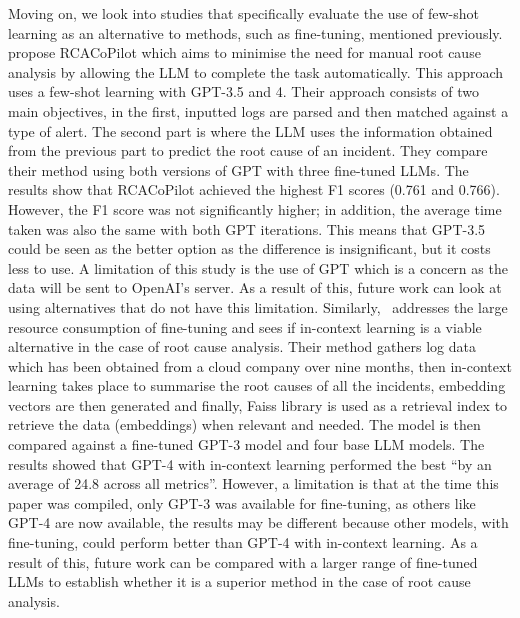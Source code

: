 Moving on, we look into studies that specifically evaluate the use of few-shot learning as an alternative to methods, such as fine-tuning, mentioned previously.~\cite{chen2024automatic} propose RCACoPilot which aims to minimise the need for manual root cause analysis by allowing the LLM to complete the task automatically. This approach uses a few-shot learning with GPT-3.5 and 4. Their approach consists of two main objectives, in the first, inputted logs are parsed and then matched against a type of alert. The second part is where the LLM uses the information obtained from the previous part to predict the root cause of an incident. They compare their method using both versions of GPT with three fine-tuned LLMs. The results show that RCACoPilot achieved the highest F1 scores (0.761 and 0.766). However, the F1 score was not significantly higher; in addition, the average time taken was also the same with both GPT iterations. This means that GPT-3.5 could be seen as the better option as the difference is insignificant, but it costs less to use. A limitation of this study is the use of GPT which is a concern as the data will be sent to OpenAI's server. As a result of this, future work can look at using alternatives that do not have this limitation. Similarly,~\cite{zhang2024automated} addresses the large resource consumption of fine-tuning and sees if in-context learning is a viable alternative in the case of root cause analysis. Their method gathers log data which has been obtained from a cloud company over nine months, then in-context learning takes place to summarise the root causes of all the incidents, embedding vectors are then generated and finally, Faiss library is used as a retrieval index to retrieve the data (embeddings) when relevant and needed. The model is then compared against a fine-tuned GPT-3 model and four base LLM models. The results showed that GPT-4 with in-context learning performed the best ``by an average of 24.8 across all metrics''. However, a limitation is that at the time this paper was compiled, only GPT-3 was available for fine-tuning, as others like GPT-4 are now available, the results may be different because other models, with fine-tuning, could perform better than GPT-4 with in-context learning. As a result of this, future work can be compared with a larger range of fine-tuned LLMs to establish whether it is a superior method in the case of root cause analysis.


